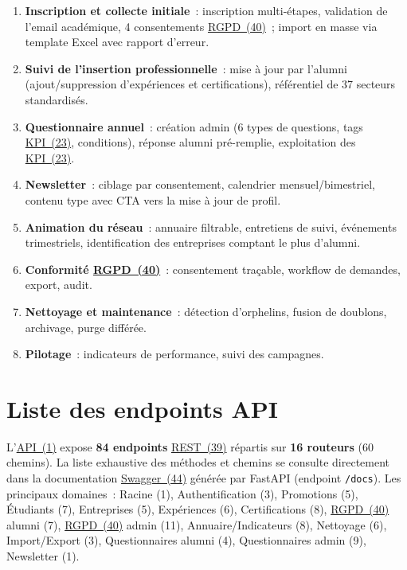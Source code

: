 \documentclass[12pt,a4paper]{report}
\begin{document}
\begin{enumerate}
  \item \textbf{Inscription et collecte initiale}~: inscription multi-étapes, validation de l'email académique, 4 consentements \hyperlink{abbr-RGPD}{RGPD~(40)}~; import en masse via template Excel avec rapport d'erreur.
  \item \textbf{Suivi de l'insertion professionnelle}~: mise à jour par l'alumni (ajout/suppression d'expériences et certifications), référentiel de 37 secteurs standardisés.
  \item \textbf{Questionnaire annuel}~: création admin (6 types de questions, tags \hyperlink{abbr-KPI}{KPI~(23)}, conditions), réponse alumni pré-remplie, exploitation des \hyperlink{abbr-KPI}{KPI~(23)}.
  \item \textbf{Newsletter}~: ciblage par consentement, calendrier mensuel/bimestriel, contenu type avec CTA vers la mise à jour de profil.
  \item \textbf{Animation du réseau}~: annuaire filtrable, entretiens de suivi, événements trimestriels, identification des entreprises comptant le plus d'alumni.
  \item \textbf{Conformité \hyperlink{abbr-RGPD}{RGPD~(40)}}~: consentement traçable, workflow de demandes, export, audit.
  \item \textbf{Nettoyage et maintenance}~: détection d'orphelins, fusion de doublons, archivage, purge différée.
  \item \textbf{Pilotage}~: indicateurs de performance, suivi des campagnes.
\end{enumerate}

\chapter{Liste des endpoints API}

L'\hyperlink{abbr-API}{API~(1)} expose \textbf{84 endpoints} \hyperlink{abbr-REST}{REST~(39)} répartis sur \textbf{16 routeurs} (60 chemins). La liste exhaustive des méthodes et chemins se consulte directement dans la documentation \hyperlink{abbr-Swagger}{Swagger~(44)} générée par FastAPI (endpoint \texttt{/docs}). Les principaux domaines~: Racine (1), Authentification (3), Promotions (5), Étudiants (7), Entreprises (5), Expériences (6), Certifications (8), \hyperlink{abbr-RGPD}{RGPD~(40)} alumni (7), \hyperlink{abbr-RGPD}{RGPD~(40)} admin (11), Annuaire/Indicateurs (8), Nettoyage (6), Import/Export (3), Questionnaires alumni (4), Questionnaires admin (9), Newsletter (1).
\end{document}
